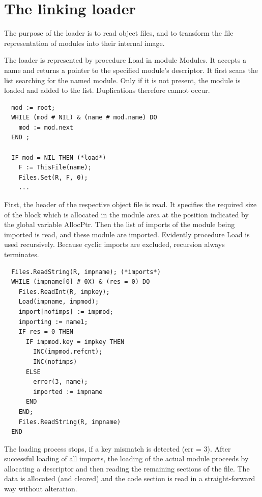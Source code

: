 \section{The linking loader}
The purpose of the loader is to read object files, and to transform the file representation of modules
into their internal image.

The loader is represented by procedure Load in module Modules. It accepts a name and returns a
pointer to the specified module's descriptor. It first scans the list searching for the named module.
Only if it is not present, the module is loaded and added to the list. Duplications therefore cannot occur.
\begin{verbatim}
  mod := root;
  WHILE (mod # NIL) & (name # mod.name) DO
    mod := mod.next
  END ;

  IF mod = NIL THEN (*load*)
    F := ThisFile(name);
    Files.Set(R, F, 0);
    ...
\end{verbatim}

First, the header of the respective object file is read. It specifies the required size of the block which is
allocated in the module area at the position indicated by the global variable AllocPtr. Then the list of
imports of the module being imported is read, and these module are imported. Evidently procedure
Load is used recursively. Because cyclic imports are excluded, recursion always terminates.
\begin{verbatim}
  Files.ReadString(R, impname); (*imports*)
  WHILE (impname[0] # 0X) & (res = 0) DO
    Files.ReadInt(R, impkey);
    Load(impname, impmod);
    import[nofimps] := impmod;
    importing := name1;
    IF res = 0 THEN
      IF impmod.key = impkey THEN
        INC(impmod.refcnt);
        INC(nofimps)
      ELSE
        error(3, name);
        imported := impname
      END
    END;
    Files.ReadString(R, impname)
  END
\end{verbatim}

The loading process stops, if a key mismatch is detected (err = 3). After successful loading of all
imports, the loading of the actual module proceeds by allocating a descriptor and then reading the
remaining sections of the file. The data is allocated (and cleared) and the code section is read in a
straight-forward way without alteration.


